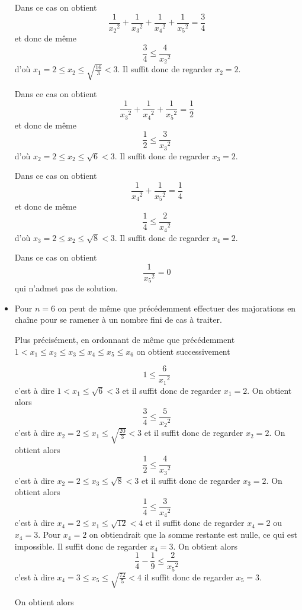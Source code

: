 \begin{sol}
\begin{itemize}
          Dans ce cas on obtient
          $$\frac{1}{{x_2}^2} + \frac{1}{{x_3}^2} + \frac{1}{{x_4}^2} + \frac{1}{{x_5}^2} = \frac{3}{4}$$
          et donc de même
          $$\frac{3}{4} \leq \frac{4}{{x_2}^2}$$
          d'où $x_1 =2 \leq x_2 \leq \sqrt{\frac{16}{3}} < 3$. Il suffit donc de regarder $x_2 = 2$.

          Dans ce cas on obtient
          $$\frac{1}{{x_3}^2} + \frac{1}{{x_4}^2} + \frac{1}{{x_5}^2} = \frac{1}{2}$$
          et donc de même
          $$\frac{1}{2} \leq \frac{3}{{x_3}^2}$$
          d'où $x_2 =2 \leq x_2 \leq \sqrt{6} < 3$. Il suffit donc de regarder $x_3 = 2$.

          Dans ce cas on obtient
          $$\frac{1}{{x_4}^2} + \frac{1}{{x_5}^2} = \frac{1}{4}$$
          et donc de même
          $$\frac{1}{4} \leq \frac{2}{{x_4}^2}$$
          d'où $x_3 =2 \leq x_2 \leq \sqrt{8} < 3$. Il suffit donc de regarder $x_4 = 2$.

          Dans ce cas on obtient
          $$\frac{1}{{x_5}^2} = 0$$
          qui n'admet pas de solution.

    \item Pour $n=6$ on peut de même que précédemment effectuer des majorations en chaîne pour se ramener à un nombre fini de cas à traiter.

          Plus précisément, en ordonnant de même que précédemment $1 < x_1 \leq x_2 \leq x_3 \leq x_4 \leq x_5 \leq x_6$ on obtient successivement

          $$1 \leq \frac{6}{{x_1}^2}$$
          c'est à dire $1 < x_1 \leq \sqrt{6} < 3$ et il suffit donc de regarder $x_1 = 2$. On obtient alors
          $$\frac{3}{4} \leq \frac{5}{{x_2}^2}$$
          c'est à dire $x_2 = 2 \leq x_1 \leq \sqrt{\frac{20}{3}} < 3$ et il suffit donc de regarder $x_2 = 2$. On obtient alors
          $$\frac{1}{2} \leq \frac{4}{{x_3}^2}$$
          c'est à dire $x_2 = 2 \leq x_3 \leq \sqrt{8} < 3$ et il suffit donc de regarder $x_3 = 2$. On obtient alors
          $$\frac{1}{4} \leq \frac{3}{{x_4}^2}$$
          c'est à dire $x_4 = 2 \leq x_1 \leq \sqrt{12} < 4$ et il suffit donc de regarder $x_4 = 2$ ou $x_4=3$. Pour $x_4 = 2$ on obtiendrait que la somme restante est nulle, ce qui est impossible. Il suffit donc de regarder $x_4 =3$. On obtient alors
          $$\frac{1}{4}-\frac{1}{9} \leq \frac{2}{{x_5}^2}$$
          c'est à dire $x_4 = 3 \leq x_5 \leq \sqrt{\frac{72}{5}} < 4$ il suffit donc de regarder $x_5 = 3$.

          On obtient alors


\end{itemize}
\end{sol}
